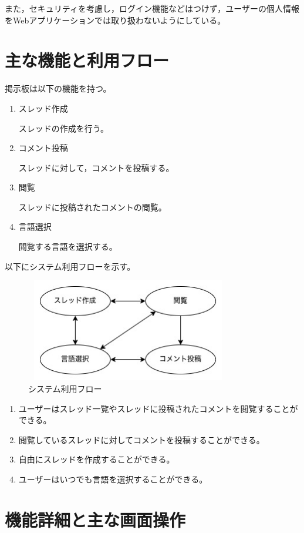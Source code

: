 \documentclass[b5paper,12pt]{jsreport}
\begin{document}
また，セキュリティを考慮し，ログイン機能などはつけず，ユーザーの個人情報をWebアプリケーションでは取り扱わないようにしている。

\section{主な機能と利用フロー}

掲示板は以下の機能を持つ。
\begin{enumerate}
	\item スレッド作成
	
	スレッドの作成を行う。
	\item コメント投稿
	
	スレッドに対して，コメントを投稿する。
	\item 閲覧
	
	スレッドに投稿されたコメントの閲覧。
	\item 言語選択
	
	閲覧する言語を選択する。
\end{enumerate}

以下にシステム利用フローを示す。

\begin{figure}[htbp]
	\centering
	\includegraphics[width=90mm,height=45mm]{img/system.jpg}

	\caption{システム利用フロー}
\end{figure}

\begin{enumerate}
	\item ユーザーはスレッド一覧やスレッドに投稿されたコメントを閲覧することができる。
	
	\item 閲覧しているスレッドに対してコメントを投稿することができる。
	\item 自由にスレッドを作成することができる。
	\item ユーザーはいつでも言語を選択することができる。
\end{enumerate}


\section{機能詳細と主な画面操作}
\end{document}
